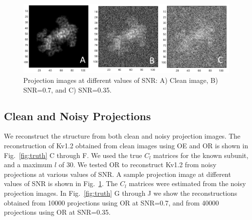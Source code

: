 \documentclass{article}
\begin{document}

\begin{figure}[b]
\centering
  \includegraphics[width=.9\columnwidth]{proj_all.png}
  \caption{Projection images at different values of SNR: A) Clean image, B) SNR=0.7, and
  C) SNR=0.35.}
\label{fig:proj}
\end{figure}
\vspace{-.15in}



\subsection{Clean and Noisy Projections}
We reconstruct the structure from both clean and noisy projection images. The
reconstruction of Kv1.2 obtained from clean images using OE and OR is shown in
Fig.~\ref{fig:truth} C through F. We used the true $C_l$ matrices for the known subunit, and a maximum
$l$ of 30. We tested OR to reconstruct Kv1.2 from noisy projections at various values of
SNR. A sample projection image at different values of SNR is shown in Fig.~\ref{fig:proj}.
The $C_l$ matrices were estimated from the noisy projection images. In
Fig.~\ref{fig:truth} G through J we show the reconstructions obtained from 10000 projections using OR
at SNR=0.7, and from 40000 projections using OR at SNR=0.35.
\end{document}

